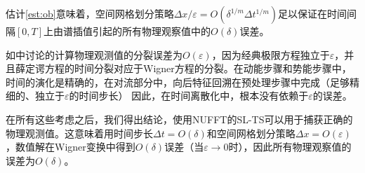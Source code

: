 估计\eqref{est:ob}意味着，空间网格划分策略$\Delta x / {\varepsilon} = O(\delta^{1 / m} \Delta t^{1 / m})$足以保证在时间间隔$[0,T]$上由谱插值引起的所有物理观察值中的$O(\delta)$误差。

如中讨论的计算物理观测值的分裂误差为$O(\varepsilon)$，因为经典极限方程独立于$\varepsilon$，并且薛定谔方程的时间分裂对应于Wigner方程的分裂。在动能步骤和势能步骤中，时间的演化是精确的，在对流部分中，向后特征回溯在预处理步骤中完成（足够精细的、独立于$\varepsilon$的时间步长） 因此，在时间离散化中，根本没有依赖于$\varepsilon$的误差。

在所有这些考虑之后，我们得出结论，使用NUFFT的SL-TS可以用于捕获正确的物理观测值。这意味着用时间步长$\Delta t = O(\delta)$和空间网格划分策略$\Delta x = O(\varepsilon)$，数值解在Wigner变换中得到$O(\delta)$误差（当$\varepsilon \rightarrow 0$时），因此所有物理观察值的误差为$O(\delta)$。



